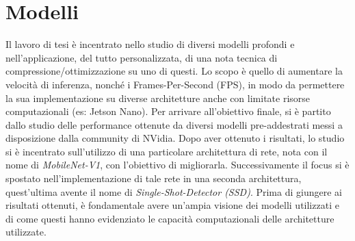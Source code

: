 \section{Modelli}
Il lavoro di tesi è incentrato nello studio di diversi modelli profondi e nell'applicazione, del tutto personalizzata, di una nota tecnica di compressione/ottimizzazione su uno di questi. Lo scopo è quello di aumentare la velocità di inferenza, nonché i Frames-Per-Second (FPS), in modo da permettere la sua implementazione su diverse architetture anche con limitate risorse computazionali (es: Jetson Nano). Per arrivare all'obiettivo finale, si è partito dallo studio delle performance ottenute da diversi modelli pre-addestrati messi a disposizione dalla community di NVidia. Dopo aver ottenuto i risultati, lo studio si è incentrato sull'utilizzo di una particolare architettura di rete, nota con il nome di \emph{MobileNet-V1}, con l'obiettivo di migliorarla. Successivamente il focus si è spostato nell'implementazione di tale rete in una seconda architettura, quest'ultima avente il nome di \emph{Single-Shot-Detector (SSD)}. Prima di giungere ai risultati ottenuti, è fondamentale avere un'ampia visione dei modelli utilizzati e di come questi hanno evidenziato le capacità computazionali delle architetture utilizzate. 
